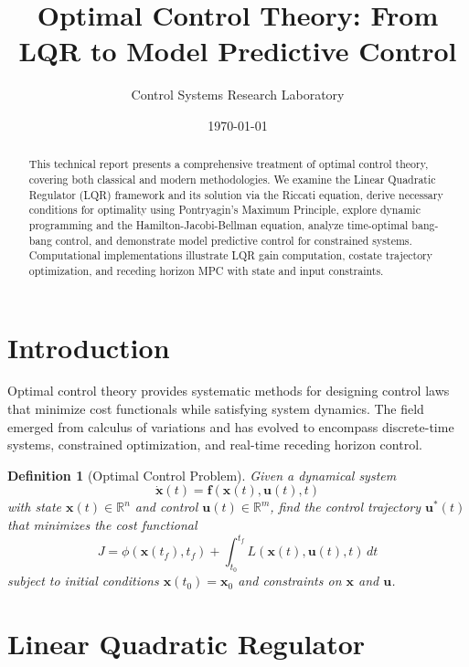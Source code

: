 \documentclass[a4paper, 11pt]{article}
\title{Optimal Control Theory: From LQR to Model Predictive Control}
\author{Control Systems Research Laboratory}
\date{\today}
\newtheorem{definition}{Definition}[section]
\begin{document}
\maketitle

\begin{abstract}
This technical report presents a comprehensive treatment of optimal control theory,
covering both classical and modern methodologies. We examine the Linear Quadratic
Regulator (LQR) framework and its solution via the Riccati equation, derive necessary
conditions for optimality using Pontryagin's Maximum Principle, explore dynamic
programming and the Hamilton-Jacobi-Bellman equation, analyze time-optimal bang-bang
control, and demonstrate model predictive control for constrained systems. Computational
implementations illustrate LQR gain computation, costate trajectory optimization, and
receding horizon MPC with state and input constraints.
\end{abstract}

\section{Introduction}

Optimal control theory provides systematic methods for designing control laws that
minimize cost functionals while satisfying system dynamics. The field emerged from
calculus of variations and has evolved to encompass discrete-time systems, constrained
optimization, and real-time receding horizon control.

\begin{definition}[Optimal Control Problem]
Given a dynamical system
\begin{equation}
\dot{\mathbf{x}}(t) = \mathbf{f}(\mathbf{x}(t), \mathbf{u}(t), t)
\end{equation}
with state $\mathbf{x}(t) \in \mathbb{R}^n$ and control $\mathbf{u}(t) \in \mathbb{R}^m$,
find the control trajectory $\mathbf{u}^*(t)$ that minimizes the cost functional
\begin{equation}
J = \phi(\mathbf{x}(t_f), t_f) + \int_{t_0}^{t_f} L(\mathbf{x}(t), \mathbf{u}(t), t) \, dt
\end{equation}
subject to initial conditions $\mathbf{x}(t_0) = \mathbf{x}_0$ and constraints on
$\mathbf{x}$ and $\mathbf{u}$.
\end{definition}

\section{Linear Quadratic Regulator}
\end{document}

